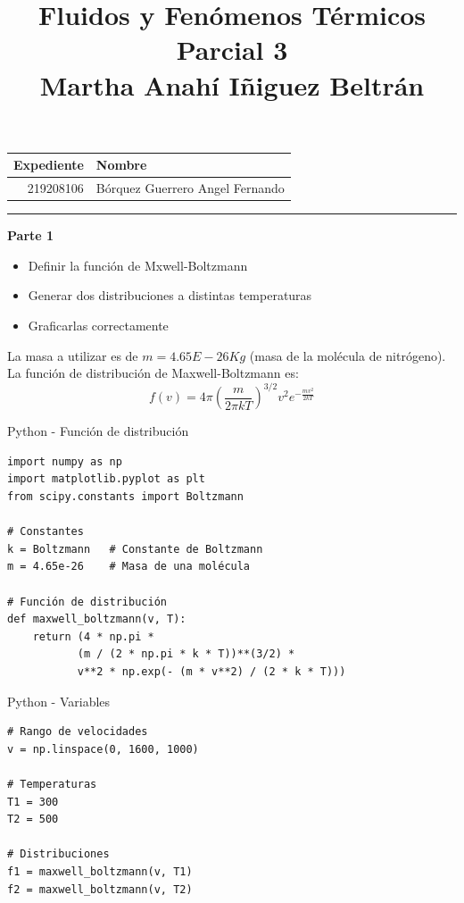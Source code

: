 \documentclass[a4paper, 11pt]{article}
\title
{
    \textbf{Fluidos y Fenómenos Térmicos} \\
    Parcial 3 \\
    \Large{ Martha Anahí Iñiguez Beltrán }
}
\begin{document}
\maketitle

\begin{center}
    \begin{tabular}{r|l}
        \textbf{Expediente} & \textbf{Nombre} \\ \hline
        219208106 & Bórquez Guerrero Angel Fernando \\
    \end{tabular}
\end{center}

\rule{\linewidth}{0.3mm}

\vspace{0.3cm}
\Large{ \textbf{ Parte 1 } }
\begin{itemize}
    \item Definir la función de Mxwell-Boltzmann
    \item Generar dos distribuciones a distintas temperaturas
    \item Graficarlas correctamente
\end{itemize}
La masa a utilizar es de $m = 4.65E-26 Kg$ (masa de la molécula de nitrógeno). \\
La función de distribución de Maxwell-Boltzmann es:
\vspace{0.3cm}
\[ f(v) = 4 \pi \left( \frac{m}{2 \pi k T} \right)^{3/2} v^{2} e^{- \frac{mv^2}{2 k T}} \]

\vspace{0.3cm}
 Python - Función de distribución
\begin{lstlisting}
import numpy as np
import matplotlib.pyplot as plt
from scipy.constants import Boltzmann

# Constantes
k = Boltzmann   # Constante de Boltzmann
m = 4.65e-26    # Masa de una molécula

# Función de distribución
def maxwell_boltzmann(v, T):
    return (4 * np.pi * 
           (m / (2 * np.pi * k * T))**(3/2) * 
           v**2 * np.exp(- (m * v**2) / (2 * k * T)))
\end{lstlisting}

\newpage
 Python - Variables
\begin{lstlisting}
# Rango de velocidades
v = np.linspace(0, 1600, 1000)

# Temperaturas
T1 = 300
T2 = 500

# Distribuciones
f1 = maxwell_boltzmann(v, T1)
f2 = maxwell_boltzmann(v, T2)
\end{lstlisting}
\end{document}
